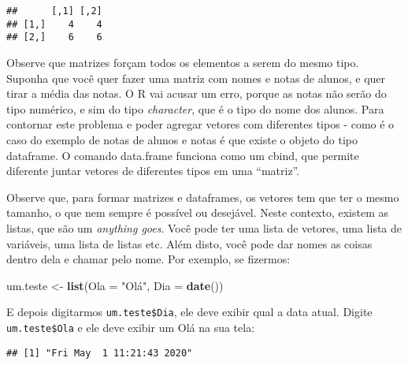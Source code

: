 \documentclass[
]{book}
\newenvironment{Shaded}{\begin{snugshade}}{\end{snugshade}}
\newcommand{\DataTypeTok}[1]{\textcolor[rgb]{0.13,0.29,0.53}{#1}}
\newcommand{\KeywordTok}[1]{\textcolor[rgb]{0.13,0.29,0.53}{\textbf{#1}}}
\newcommand{\NormalTok}[1]{#1}
\newcommand{\OperatorTok}[1]{\textcolor[rgb]{0.81,0.36,0.00}{\textbf{#1}}}
\newcommand{\StringTok}[1]{\textcolor[rgb]{0.31,0.60,0.02}{#1}}
\begin{document}
\begin{verbatim}
##      [,1] [,2]
## [1,]    4    4
## [2,]    6    6
\end{verbatim}

Observe que matrizes forçam todos os elementos a serem do mesmo tipo. Suponha que você quer fazer uma matriz com nomes e notas de alunos, e quer tirar a média das notas. O R vai acusar um erro, porque as notas não serão do tipo numérico, e sim do tipo \emph{character}, que é o tipo do nome dos alunos. Para contornar este problema e poder agregar vetores com diferentes tipos - como é o caso do exemplo de notas de alunos e notas é que existe o objeto do tipo dataframe. O comando data.frame funciona como um cbind, que permite diferente juntar vetores de diferentes tipos em uma ``matriz''.

Observe que, para formar matrizes e dataframes, os vetores tem que ter o mesmo tamanho, o que nem sempre é possível ou desejável. Neste contexto, existem as listas, que são um \emph{anything goes}. Você pode ter uma lista de vetores, uma lista de variáveis, uma lista de listas etc. Além disto, você pode dar nomes as coisas dentro dela e chamar pelo nome. Por exemplo, se fizermos:

\begin{Shaded}
\begin{Highlighting}[]
\NormalTok{um.teste \textless{}{-}}\StringTok{ }\KeywordTok{list}\NormalTok{(}\DataTypeTok{Ola =} \StringTok{"Olá"}\NormalTok{, }\DataTypeTok{Dia =} \KeywordTok{date}\NormalTok{())}
\end{Highlighting}
\end{Shaded}

E depois digitarmos \texttt{um.teste\$Dia}, ele deve exibir qual a data atual. Digite \texttt{um.teste\$Ola} e ele deve exibir um Olá na sua tela:

\begin{Shaded}
\end{Shaded}

\begin{verbatim}
## [1] "Fri May  1 11:21:43 2020"
\end{verbatim}

\begin{Shaded}
\end{Shaded}
\end{document}
